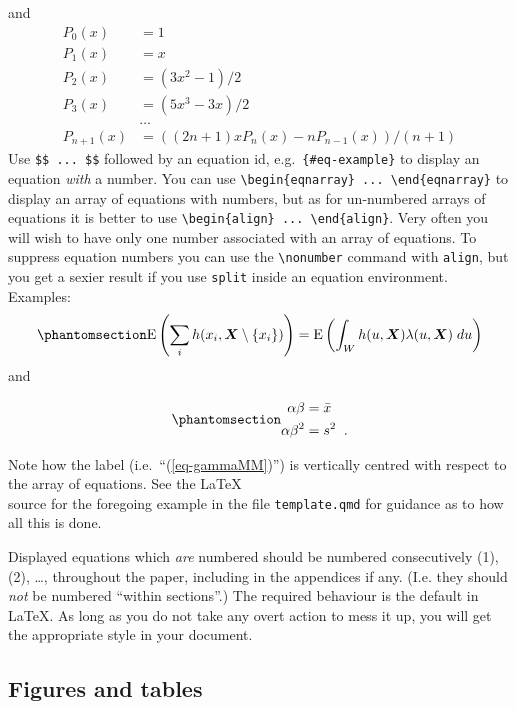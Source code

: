 \documentclass[
doublespace,
  times]{anzsauth}
\begin{document}
and \begin{align*}
P_0(x) &= 1 \\
P_1(x) &= x \\
P_2(x) &= (3x^2 - 1)/2 \\
P_3(x) &= (5x^3 - 3x)/2 \\
       & \ldots \\
P_{n+1}(x) &= ((2n+1)xP_n(x) - nP_{n-1}(x))/(n+1)
\end{align*} Use \texttt{\$\$\ ...\ \$\$} followed by an equation id,
e.g.~\texttt{\{\#eq-example\}} to display an equation \emph{with} a
number. You can use
\texttt{\textbackslash{}begin\{eqnarray\}\ ...\ \textbackslash{}end\{eqnarray\}}
to display an array of equations with numbers, but as for un-numbered
arrays of equations it is better to use
\texttt{\textbackslash{}begin\{align\}\ ...\ \textbackslash{}end\{align\}}.
Very often you will wish to have only one number associated with an
array of equations. To suppress equation numbers you can use the
\texttt{\textbackslash{}nonumber} command with \texttt{align}, but you
get a sexier result if you use \texttt{split} inside an equation
environment. Examples: \begin{equation}\phantomsection\label{eq-GNZ}{
\E \left (\sum_i h(x_i,\bX \setminus \{x_i\}) \right )
= \E \left ( \int_W h(u,\bX) \lambda(u,\bX) \; du \right )
}\end{equation} and

\begin{equation}\phantomsection\label{eq-gammaMM}{\begin{split}
\alpha \beta &= \bar{x} \\
\alpha \beta^2 &= s^2 \;\; .
\end{split}
}\end{equation}

Note how the label (i.e.~``(\ref{eq-gammaMM})'') is vertically centred
with respect to the array of equations. See the \LaTeX\\
source for the foregoing example in the file \texttt{template.qmd} for
guidance as to how all this is done.

Displayed equations which \emph{are} numbered should be numbered
consecutively (1), (2), \ldots, throughout the paper, including in the
appendices if any. (I.e. they should \emph{not} be numbered ``within
sections''.) The required behaviour is the default in \LaTeX. As long as
you do not take any overt action to mess it up, you will get the
appropriate style in your document.

\subsection{Figures and tables}\label{sec-figAndTab}
\end{document}
